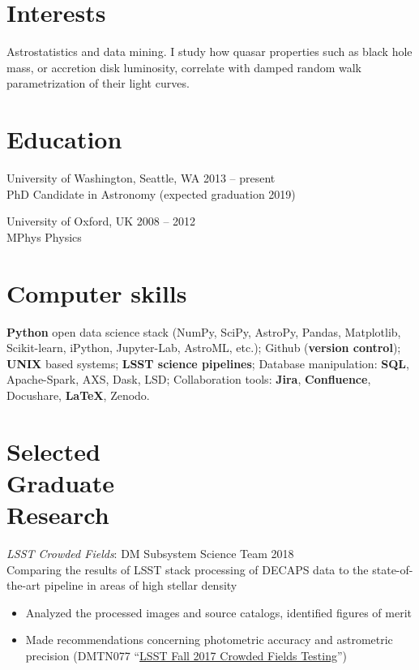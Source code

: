 \documentclass[margin]{res}
\begin{document}
\begin{resume}

\section{Interests} Astrostatistics and data mining. I study how quasar properties such as black hole mass, or accretion disk luminosity, correlate with damped random walk parametrization of their light curves.

%




\section{Education} 
University of Washington, Seattle, WA \hfill 2013 -- present\\
PhD Candidate in Astronomy (expected graduation 2019)

University of Oxford, UK \hfill 2008 -- 2012\\
MPhys Physics

\section{Computer skills}
\textbf{Python} open data science stack (NumPy, SciPy, AstroPy, Pandas, Matplotlib, Scikit-learn, iPython, Jupyter-Lab, AstroML, etc.); 
Github (\textbf{version control});
\textbf{UNIX} based systems;
\textbf{LSST science pipelines}; 
Database manipulation: \textbf{SQL}, Apache-Spark, AXS, Dask, LSD; 
Collaboration tools: \textbf{Jira}, \textbf{Confluence}, Docushare, \textbf{LaTeX}, Zenodo.


\section{Selected \\Graduate \\Research} 
{\sl LSST Crowded Fields}:  DM Subsystem Science Team  \hfill          2018\\
Comparing the results of LSST stack processing of DECAPS data to the state-of-the-art pipeline in areas of high stellar density 
\begin{itemize}  \itemsep -2pt %
\item Analyzed the processed images and source catalogs, identified figures of merit
\item Made recommendations concerning photometric accuracy and astrometric precision (DMTN077 ``\href{https://dmtn-077.lsst.io}{LSST Fall 2017 Crowded Fields Testing}'')
\end{itemize}  


\end{resume}
\end{document}

